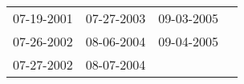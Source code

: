 \begin{supertabular}{llll}
 07-19-2001 &  07-27-2003 &  09-03-2005 \\
 07-26-2002 &  08-06-2004 &  09-04-2005 \\
 07-27-2002 &  08-07-2004 &             \\
\end{supertabular}
